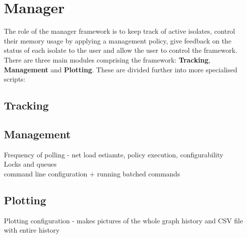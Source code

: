 \documentclass{l4proj}
\begin{document}
\section{Manager}
\hspace*{3em} The role of the manager framework is to keep track of active isolates, control their memory usage by applying a management policy, give feedback on the status of each isolate to the user and allow the user to control the framework. There are three main modules comprising the framework: \textbf{Tracking}, \textbf{Management} and \textbf{Plotting}. These are divided further into more specialised scripts:
\subsection{Tracking}

\subsection{Management}
Frequency of polling - net load estiamte, policy execution, configurability
\\Locks and queues
\\command line configuration + running batched commands
\subsection{Plotting}
Plotting configuration - makes pictures of the whole graph history and CSV file with entire history
\end{document}
